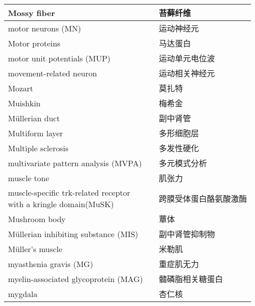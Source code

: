 \begin{longtable}{lll}
	\midrule
	Mossy fiber   && 苔藓纤维  \\
	
	\midrule
	motor neurons (MN)   && 运动神经元  \\
	
	\midrule
	Motor proteins   && 马达蛋白  \\
	
	\midrule
	motor unit potentials (MUP)  && 运动单元电位波  \\
	
	\midrule
	movement-related neuron  && 运动相关神经元  \\
	
	\midrule
	Mozart  && 莫扎特  \\
	
	\midrule
	Muishkin   && 梅希金  \\
	
	\midrule
	Müllerian duct   && 副中肾管  \\
	
	\midrule
	Multiform layer   && 多形细胞层  \\
	
	\midrule
	Multiple sclerosis   && 多发性硬化  \\
	
	\midrule
	multivariate pattern analysis (MVPA)  && 多元模式分析  \\
	
	\midrule
	muscle tone   && 肌张力  \\
	
	\midrule
	\makecell[l]{muscle-specific trk-related receptor \\with a kringle domain(MuSK)}   && 跨膜受体蛋白酪氨酸激酶  \\
	
	\midrule
	Mushroom body   && 蕈体  \\
	
	\midrule
	Müllerian inhibiting substance (MIS)   && 副中肾管抑制物  \\
	
	\midrule
	Müller's muscle   && 米勒肌  \\
	
	\midrule
	myasthenia gravis (MG)    && 重症肌无力   \\
	
	\midrule
	myelin-associated glycoprotein (MAG)     && 髓磷脂相关糖蛋白   \\
	
	\midrule
	mygdala     && 杏仁核   \\
	

\end{longtable}
